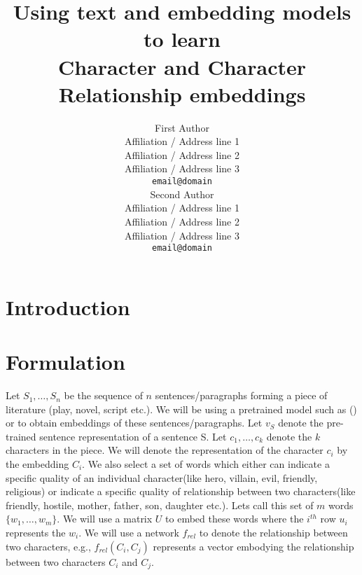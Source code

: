 \documentclass[11pt,a4paper]{article}
\title{Using text and embedding models to learn \\
Character and Character Relationship embeddings}
\author{First Author \\
  Affiliation / Address line 1 \\
  Affiliation / Address line 2 \\
  Affiliation / Address line 3 \\
  \texttt{email@domain} \\\And
  Second Author \\
  Affiliation / Address line 1 \\
  Affiliation / Address line 2 \\
  Affiliation / Address line 3 \\
  \texttt{email@domain} \\}
\date{}
\date{}
\begin{document}
\maketitle

\section{Introduction}
\section{Formulation}
Let $S_1,\ldots, S_n$ be the sequence of $n$ sentences/paragraphs forming a piece of literature (play, novel, script etc.). 
We will be using a pretrained model such as \sentencebert (\sbert) \citep{reimers-2019-sentence-bert} or \stov \citep{pagliardini-etal-2018-unsupervised} to obtain embeddings of these sentences/paragraphs.
Let $v_S$ denote the pre-trained sentence representation of a sentence S. 
Let $c_1,\ldots,c_k$ denote the $k$ characters in the piece. 
We will denote the representation of the character $c_i$ by the embedding $C_i$. 
We also select a set of words which either can indicate a specific quality of an individual character(like hero, villain, evil, friendly, religious) 
or indicate a specific quality of relationship between two characters(like friendly, hostile, mother, father, son, daughter etc.). 
Lets call this set of $m$ words $\{w_1,\ldots,w_m\}$. 
We will use a matrix $U$ to embed these words where the $i^{th}$ row $u_i$ represents the $w_i$.
We will use a network $f_{rel}$ to denote the relationship between two characters, e.g., $f_{rel}(C_i,C_j)$ represents a vector embodying the relationship between two characters $C_i$ and $C_j$.
\end{document}
